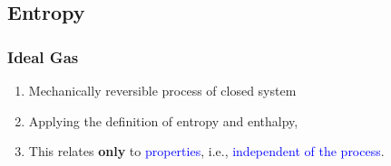 \documentclass[10pt,compress]{beamer}
\begin{document}

\subsection{Entropy} 

\begin{frame}
 \frametitle{Ideal Gas}
   \begin{enumerate}
     \item<1-> Mechanically reversible process of closed system
     \item<2-> Applying the definition of entropy and enthalpy,
     \item<2-> This relates {\bf only} to \textcolor{blue}{properties}, i.e., \textcolor{blue}{independent of the process}.
   \end{enumerate}
 \normalsize
\end{frame}
\end{document}
